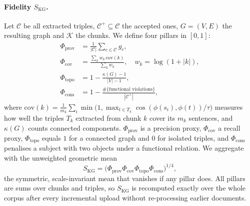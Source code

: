 \documentclass[10pt,twocolumn]{article}
\theoremstyle{remark}
\begin{document}
\paragraph{Fidelity $S_{\mathrm{KG}}$.}
Let $\mathcal C$ be all extracted triples, $\mathcal C^{+}\subseteq\mathcal C$ the accepted ones, $G=(V,E)$ the
resulting graph and $\mathcal K$ the chunks. We define four pillars in $[0,1]$:
\begin{align}
\Phi_{\mathrm{prov}} &= \tfrac{1}{|\mathcal C|}\textstyle\sum_{c\in\mathcal C} g_c, \\
\Phi_{\mathrm{cov}}  &= \frac{\sum_{k} w_k\,\mathrm{cov}(k)}{\sum_k w_k},\quad w_k=\log(1+|k|),\\
\Phi_{\mathrm{topo}} &= 1-\frac{\kappa(G)-1}{|V|-1}, \\
\Phi_{\mathrm{cons}} &= 1-\frac{\#\{\text{functional violations}\}}{|\mathcal C^{+}|},
\end{align}
where $\mathrm{cov}(k)=\frac{1}{m_k}\sum_{i}\min\!\big(1,\max_{t\in T_k}\cos(\phi(s_i),\phi(t))/\tau\big)$ measures how
well the triples $T_k$ extracted from chunk $k$ cover its $m_k$ sentences, and $\kappa(G)$ counts connected
components. $\Phi_{\mathrm{prov}}$ is a precision proxy, $\Phi_{\mathrm{cov}}$ a recall proxy, $\Phi_{\mathrm{topo}}$
equals $1$ for a connected graph and $0$ for isolated triples, and $\Phi_{\mathrm{cons}}$ penalises a subject with two
objects under a functional relation. We aggregate with the unweighted geometric mean
\begin{equation}
S_{\mathrm{KG}}=\big(\Phi_{\mathrm{prov}}\Phi_{\mathrm{cov}}\Phi_{\mathrm{topo}}\Phi_{\mathrm{cons}}\big)^{1/4},
\label{eq:skg}
\end{equation}
the symmetric, scale-invariant mean that vanishes if any pillar does. All pillars are sums over chunks and triples,
so $S_{\mathrm{KG}}$ is recomputed exactly over the whole corpus after every incremental upload without
re-processing earlier documents.
\end{document}
